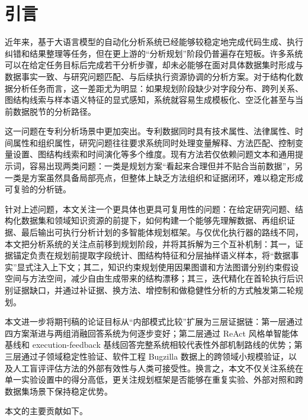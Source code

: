 \section{引言}

近年来，基于大语言模型的自动化分析系统已经能够较稳定地完成代码生成、执行纠错和结果整理等任务，但在更上游的“分析规划”阶段仍普遍存在短板\citep{guo2024dsagent,hong2025data,zhang2025data,sun2025survey}。许多系统可以在给定任务目标后完成若干分析步骤，却未必能够在面对具体数据集时形成与数据事实一致、与研究问题匹配、与后续执行资源协调的分析方案。对于结构化数据分析任务而言，这一差距尤为明显：如果规划阶段缺少对字段分布、跨列关系、图结构线索与样本语义特征的显式感知，系统就容易生成模板化、空泛化甚至与当前数据脱节的分析路径。

这一问题在专利分析场景中更加突出\citep{basberg1987patents,zhu2014patent,mejia2024patent}。专利数据同时具有技术属性、法律属性、时间属性和组织属性，研究问题往往要求系统同时处理变量解释、方法匹配、控制变量设置、图结构线索和时间演化等多个维度。现有方法若仅依赖问题文本和通用提示词，容易出现两类问题：一类是规划方案“看起来合理但并不贴合当前数据”，另一类是方案虽然具备局部亮点，但整体上缺乏方法组织和证据闭环，难以稳定形成可复验的分析链。

针对上述问题，本文关注一个更具体也更具可复用性的问题：在给定研究问题、结构化数据集和领域知识资源的前提下，如何构建一个能够先理解数据、再组织证据、最后输出可执行分析计划的多智能体规划框架。与仅优化执行器的路线不同\citep{yao2023react,wu2023autogen,hong2024metagpt,li2023camel}，本文把分析系统的关注点前移到规划阶段，并将其拆解为三个互补机制：其一，证据锚定负责在规划前提取字段统计、图结构特征和分层抽样语义样本，将“数据事实”显式注入上下文；其二，知识约束规划使用因果图谱和方法图谱分别约束假设空间与方法空间，减少自由生成带来的结构漂移；其三，迭代精化在首轮执行后识别证据缺口，并通过补证据、换方法、增控制和做稳健性分析的方式触发第二轮规划\citep{shinn2024reflexion,zhou2024hypothesis}。

本文进一步将期刊稿的论证目标从“内部模式比较”扩展为三层证据链：第一层通过四方案渐进与两组消融回答系统为何逐步变好；第二层通过 ReAct 风格单智能体基线和 execution-feedback 基线回答完整系统相较代表性外部机制路线的优势；第三层通过子领域稳定性验证、软件工程 Bugzilla 数据上的跨领域小规模验证，以及人工盲评评估方法的外部有效性与人类可接受性。换言之，本文不仅关注系统在单一实验设置中的得分高低，更关注规划框架是否能够在重复实验、外部对照和跨数据集场景下保持稳定优势。

本文的主要贡献如下。

